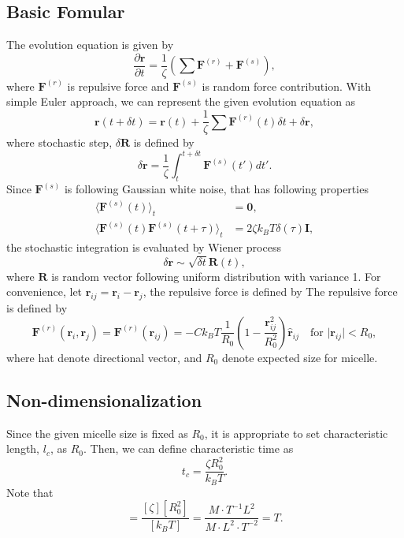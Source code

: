 \documentclass[10pt, a4paper]{article}
\begin{document}
\subsection{Basic Fomular}
The evolution equation is given by
\begin{equation}
\frac{\partial \mathbf{r}}{\partial t} = \frac{1}{\zeta}\left(\sum \mathbf{F}^{(r)} + \mathbf{F}^{(s)}\right),
\end{equation}
where $\mathbf{F}^{(r)}$ is repulsive force and $\mathbf{F}^{(s)}$ is random force contribution. With simple Euler approach, we can represent the given evolution equation as
\begin{equation}
\mathbf{r}(t + \delta t) = \mathbf{r}(t) + \frac{1}{\zeta}\sum\mathbf{F}^{(r)}(t)\delta t + \delta \mathbf{r},
\end{equation}
where stochastic step, $\delta \mathbf{R}$ is defined by
\begin{equation}
\delta \mathbf{r} = \frac{1}{\zeta}\int_t^{t+\delta t}\mathbf{F}^{(s)}(t')dt'.\label{eq:stochastic_step}
\end{equation}
Since $\mathbf{F}^{(s)}$ is following Gaussian white noise, that has following properties
\begin{align}
\langle \mathbf{F}^{(s)}(t)\rangle_t &= \mathbf{0}, \\
\langle \mathbf{F}^{(s)}(t)\mathbf{F}^{(s)}(t+\tau)\rangle_t &=2\zeta k_BT\delta(\tau)\mathbf{I},\label{eq:fluctuation_dissipation_noise}
\end{align}
the stochastic integration is evaluated by Wiener process \parencite{GREINER:1988cq, VandenBrule:1995fq}
\begin{equation}
  \delta\mathbf{r} \sim \sqrt{\delta t}\mathbf{R}(t),
\end{equation}
where $\mathbf{R}$ is random vector following uniform distribution with variance 1.
For convenience, let $\mathbf{r}_{ij} = \mathbf{r}_i - \mathbf{r}_j$, the repulsive force is defined by
The repulsive force is defined by
\begin{equation}
\mathbf{F}^{(r)}(\mathbf{r}_i, \mathbf{r}_j) = \mathbf{F}^{(r)}(\mathbf{r}_{ij}) = -Ck_BT\frac{1}{R_0}\left(1 - \frac{\mathbf{r}_{ij}^2}{R_0^2}\right)\hat{\mathbf{r}}_{ij} \quad\textrm{for } \lvert\mathbf{r}_{ij}\rvert < R_0,
\end{equation}
where hat denote directional vector, and $R_0$ denote expected size for micelle.

\subsection{Non-dimensionalization}
Since the given micelle size is fixed as $R_0$, it is appropriate to set characteristic length, $l_c$, as $R_0$. Then, we can define characteristic time as
\begin{equation}
t_c = \frac{\zeta R_0^2}{k_BT}.
\end{equation}
Note that
\begin{equation}
[t_c] = \frac{[\zeta][R_0^2]}{[k_BT]} = \frac{M\cdot T^{-1} L^2}{M\cdot L^2\cdot T^{-2}} = T.
\end{equation}
\end{document}
